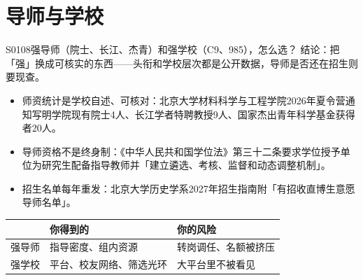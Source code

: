 \section{导师与学校}
\begin{qa}{S0108}{强导师（院士、长江、杰青）和强学校（C9、985），怎么选？}
结论：把「强」换成可核实的东西——头衔和学校层次都是公开数据，导师是否还在招生则要现查。

\begin{itemize}
  \item 师资统计是学校自述、可核对：北京大学材料科学与工程学院2026年夏令营通知写明学院现有院士4人、长江学者特聘教授9人、国家杰出青年科学基金获得者20人。
  \item 导师资格不是终身制：《中华人民共和国学位法》第三十二条要求学位授予单位为研究生配备指导教师并「建立遴选、考核、监督和动态调整机制」。
  \item 招生名单每年重发：北京大学历史学系2027年招生指南附「有招收直博生意愿导师名单」。
\end{itemize}

\par\vspace{2pt}\nobreak\begin{center}\footnotesize
\begin{tabularx}{\textwidth}{>{\raggedright\arraybackslash}X>{\raggedright\arraybackslash}X>{\raggedright\arraybackslash}X}
\toprule
\textbf{} & \textbf{你得到的} & \textbf{你的风险} \\ \midrule
强导师 & 指导密度、组内资源 & 转岗调任、名额被挤压 \\
强学校 & 平台、校友网络、筛选光环 & 大平台里不被看见 \\
\bottomrule
\end{tabularx}
\end{center}\vspace{2pt}\par
{}
\end{qa}

